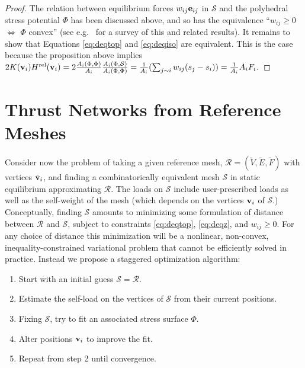 \documentclass[annual]{acmsiggraph}
\def\rel{{\mathord{\text{\rm rel}}}}
\def\SS{{\mathcal S}}
\def\RR{{\mathcal R}}
\begin{document}
\begin{proof} The relation between equilibrium forces $w_{ij}{\mathbf e}_{ij}$ in 
$\SS$ and the polyhedral stress potential $\Phi$ has been discussed above, 
and so has the equivalence ``$w_{ij}\ge 0$ $\iff$ $\Phi$ convex'' (see 
e.g.\ \cite{Ash1988} for a survey of this and related results). It remains 
to show that Equations \eqref{eq:deqtop} and \eqref{eq:deqiso} are 
equivalent. This is the case because the proposition above implies
	$
	2 K(\vw_i) H^\rel(\vw_i) = 
	2 \frac{A_i(\Phi,\Phi)}{A_i}
	\frac{A_i(\Phi,\SS)}{A_i(\Phi,\Phi)} = 
	{1\over A_i}
	(\sum_{j\sim i} w_{ij} (s_j-s_i))
	= {1\over A_i} A_i F_i.
	$
	\end{proof}


\section{Thrust Networks from Reference Meshes} \label{sec:opt} Consider 
now the problem of taking a given reference mesh, $\RR = 
(\tilde{V},\tilde{E},\tilde{F})$ with vertices $\tilde{{\mathbf v}}_i$, and 
finding a combinatorically equivalent mesh $\SS$ in static equilibrium 
approximating $\RR$. The loads on $\SS$ include user-prescribed loads as 
well as the self-weight of the mesh (which depends on the vertices ${\mathbf v}_i$ 
of $\SS$.) Conceptually, finding $\SS$ amounts to minimizing some 
formulation of distance between $\RR$ and $\SS$, subject to constraints 
\eqref{eq:deqtop}, \eqref{eq:deqz}, and $w_{ij} \geq 0$. For any choice of 
distance this minimization will be a nonlinear, non-convex, 
inequality-constrained variational problem that cannot be efficiently 
solved in practice. Instead we propose a staggered optimization algorithm:

\begin{enumerate}\itemsep-\parsep

\item Start with an initial guess $\SS = \RR$.

\item Estimate the self-load on the vertices of $\SS$ from their current 
positions.

\item Fixing $\SS$, try to fit an associated stress surface $\Phi$.

\item Alter positions ${\mathbf v}_i$ to improve the fit.

\item Repeat from step 2 until convergence.

\end{enumerate}
\end{document}
